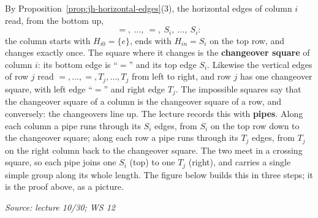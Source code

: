 \documentclass[11pt]{report}
\newcommand{\srcline}[1]{\par\hfill{\footnotesize\textit{Source: #1}}}
\begin{document}
\begin{rembox}\label{rem:jh-pipes}
By Proposition~\ref{prop:jh-horizontal-edges}(3), the horizontal edges of column $i$ read, from the bottom up,
\[ =,\ \ldots,\ =,\ S_i,\ \ldots,\ S_i : \]
the column starts with $H_{i0} = \{e\}$, ends with $H_{in} = S_i$ on the top row, and changes exactly once. The square where it changes is the \textbf{changeover square} of column $i$: its bottom edge is ``$=$'' and its top edge $S_i$. Likewise the vertical edges of row $j$ read $=, \ldots, =, T_j, \ldots, T_j$ from left to right, and row $j$ has one changeover square, with left edge ``$=$'' and right edge $T_j$. The impossible squares say that the changeover square of a column is the changeover square of a row, and conversely: the changeovers line up. The lecture records this with \textbf{pipes}. Along each column a pipe runs through its $S_i$ edges, from $S_i$ on the top row down to the changeover square; along each row a pipe runs through its $T_j$ edges, from $T_j$ on the right column back to the changeover square. The two meet in a crossing square, so each pipe joins one $S_i$ (top) to one $T_j$ (right), and carries a single simple group along its whole length. The figure below builds this in three steps; it is the proof above, as a picture.
\srcline{lecture 10/30; WS 12}
\end{rembox}
\end{document}
